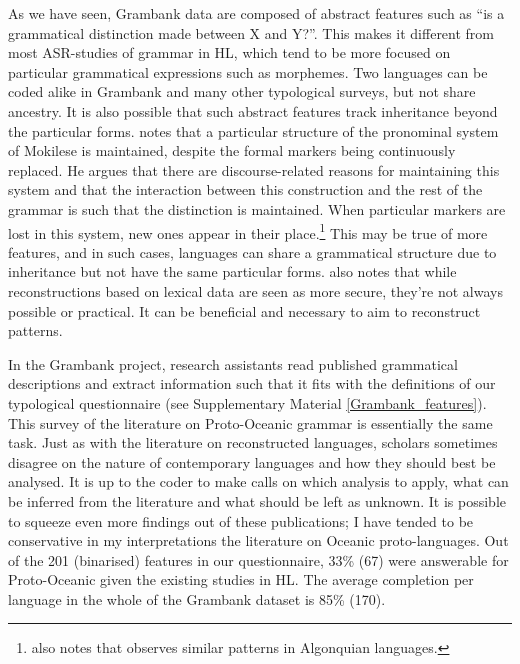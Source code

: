 \documentclass[12pt,letterpaper]{article}
\begin{document}
As we have seen, Grambank data are composed of abstract features such as ``is a grammatical distinction made between X and Y?''. This makes it different from most ASR-studies of grammar in HL, which tend to be more focused on particular grammatical expressions such as morphemes. Two languages can be coded alike in Grambank and many other typological surveys, but not share ancestry. It is also possible that such abstract features track inheritance beyond the particular forms. \citet[503]{ross2004morphosyntactic} notes that a particular structure of the pronominal system of Mokilese is maintained, despite the formal markers being continuously replaced. He argues that there are discourse-related reasons for maintaining this system and that the interaction between this construction and the rest of the grammar is such that the distinction is maintained. When particular markers are lost in this system, new ones appear in their place.\footnote{\citet{ross2004morphosyntactic} also notes that \citet{goddard1993algonquian} observes similar patterns in Algonquian languages.} This may be true of more features, and in such cases, languages can share a grammatical structure due to inheritance but not have the same particular forms. \citet[400--401]{evans2003study} also notes that while reconstructions based on lexical data are seen as more secure, they're not always possible or practical. It can be beneficial and necessary to aim to reconstruct patterns. %

In the Grambank project, research assistants read published grammatical descriptions and extract information such that it fits with the definitions of our typological questionnaire (see Supplementary Material \ref{Grambank_features}). This survey of the literature on Proto-Oceanic grammar is essentially the same task. Just as with the literature on reconstructed languages, scholars sometimes disagree on the nature of contemporary languages and how they should best be analysed. It is up to the coder to make calls on which analysis to apply, what can be inferred from the literature and what should be left as unknown. It is possible to squeeze even more findings out of these publications; I have tended to be conservative in my interpretations the literature on Oceanic proto-languages. Out of the 201 (binarised) features in our questionnaire, 33\% (67) were answerable for Proto-Oceanic given the existing studies in HL. The average completion per language in the whole of the Grambank dataset is 85\% (170). 
\end{document}

